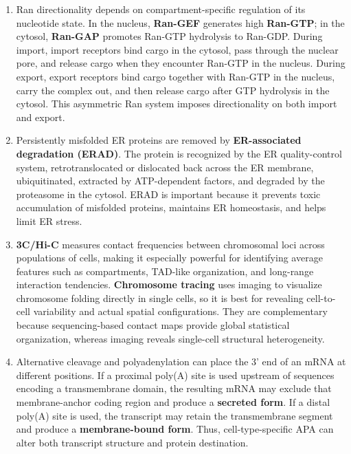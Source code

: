 \documentclass[12pt,fontset=none]{ctexart}
\begin{document}
\begin{enumerate}
\item Ran directionality depends on compartment-specific regulation of its nucleotide state. In the nucleus, \textbf{Ran-GEF} generates high \textbf{Ran-GTP}; in the cytosol, \textbf{Ran-GAP} promotes Ran-GTP hydrolysis to Ran-GDP. During import, import receptors bind cargo in the cytosol, pass through the nuclear pore, and release cargo when they encounter Ran-GTP in the nucleus. During export, export receptors bind cargo together with Ran-GTP in the nucleus, carry the complex out, and then release cargo after GTP hydrolysis in the cytosol. This asymmetric Ran system imposes directionality on both import and export.

\item Persistently misfolded ER proteins are removed by \textbf{ER-associated degradation (ERAD)}. The protein is recognized by the ER quality-control system, retrotranslocated or dislocated back across the ER membrane, ubiquitinated, extracted by ATP-dependent factors, and degraded by the proteasome in the cytosol. ERAD is important because it prevents toxic accumulation of misfolded proteins, maintains ER homeostasis, and helps limit ER stress.

\item \textbf{3C/Hi-C} measures contact frequencies between chromosomal loci across populations of cells, making it especially powerful for identifying average features such as compartments, TAD-like organization, and long-range interaction tendencies. \textbf{Chromosome tracing} uses imaging to visualize chromosome folding directly in single cells, so it is best for revealing cell-to-cell variability and actual spatial configurations. They are complementary because sequencing-based contact maps provide global statistical organization, whereas imaging reveals single-cell structural heterogeneity.

\item Alternative cleavage and polyadenylation can place the 3' end of an mRNA at different positions. If a proximal poly(A) site is used upstream of sequences encoding a transmembrane domain, the resulting mRNA may exclude that membrane-anchor coding region and produce a \textbf{secreted form}. If a distal poly(A) site is used, the transcript may retain the transmembrane segment and produce a \textbf{membrane-bound form}. Thus, cell-type-specific APA can alter both transcript structure and protein destination.
\end{enumerate}
\end{document}
